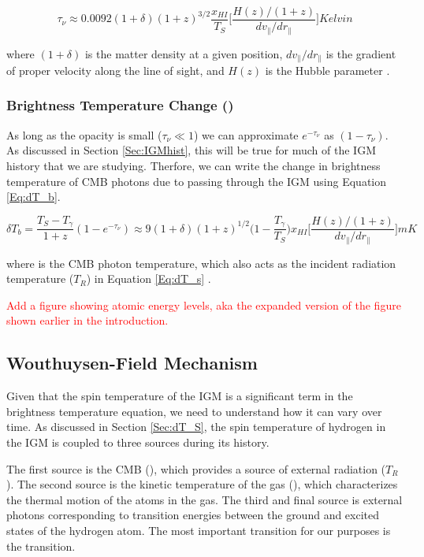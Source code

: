 \begin{equation}
\tau_{\nu} \approx 0.0092 (1+\delta) (1+z)^{3/2} \frac{x_{HI}}{T_S} \Big[ \frac{H(z)/(1+z)}{dv_{\parallel}/dr_{\parallel}} \Big] Kelvin
\end{equation} 

where $(1+\delta)$ is the matter density at a given position, $dv_{\parallel}/dr_{\parallel}$ is the gradient of proper velocity along the line of sight, and $H(z)$ is the Hubble parameter \cite{furlanetto_2006}. 

\subsubsection{Brightness Temperature Change (\dtb)}
As long as the opacity is small ($\tau_\nu \ll 1$) we can approximate $e^{-\tau_\nu}$ as $(1-\tau_\nu)$. As discussed in Section \ref{Sec:IGMhist}, this will be true for much of the IGM history that we are studying. Therfore, we can write the change in brightness temperature of CMB photons due to passing through the IGM using Equation \ref{Eq:dT_b}.

\begin{equation}\label{Eq:dT_b}
\delta T_b = \frac{T_S - T_\gamma}{1+z}(1-e^{-\tau_\nu}) \approx 9 (1+\delta) (1+z)^{1/2} \Big(1-\frac{T_\gamma}{T_S}\Big) x_{HI} \Big[ \frac{H(z)/(1+z)}{dv_{\parallel}/dr_{\parallel}} \Big] mK
\end{equation}

where \tg is the CMB photon temperature, which also acts as the incident radiation temperature ($T_R$) in Equation \ref{Eq:dT_s} \cite{furlanetto_2006}. 

\textcolor{red}{Add a figure showing atomic energy levels, aka the expanded version of the figure shown earlier in the introduction. }

\subsection{Wouthuysen-Field Mechanism}\label{Sec:WFM}
Given that the spin temperature of the IGM is a significant term in the brightness temperature equation, we need to understand how it can vary over time. As discussed in Section \ref{Sec:dT_S}, the spin temperature of hydrogen in the IGM is coupled to three sources during its history. 

The first source is the CMB (\tg), which provides a source of external radiation ($T_R$). The second source is the kinetic temperature of the gas (\tk), which characterizes the thermal motion of the atoms in the gas. The third and final source is external photons corresponding to transition energies between the ground and excited states of the hydrogen atom. The most important transition for our purposes is the \lya  transition. 

